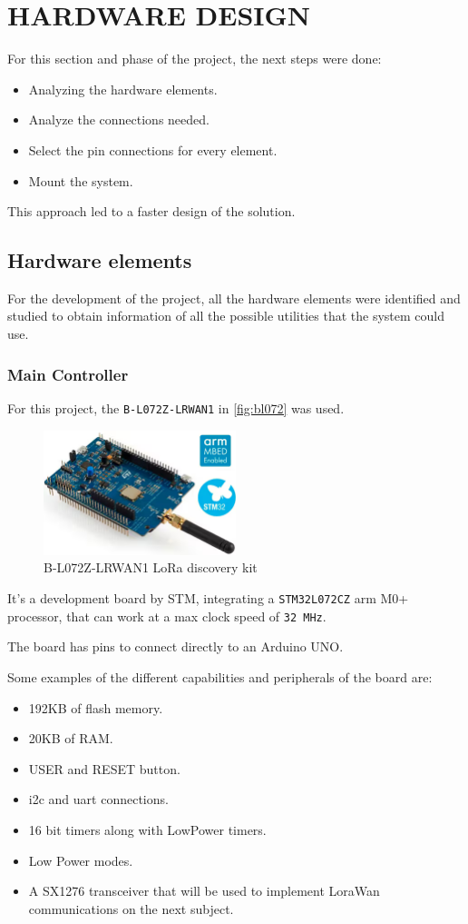\section{HARDWARE DESIGN}
For this section and phase of the project, the next steps were done:
\begin{itemize}
    \item Analyzing the hardware elements.
    \item Analyze the connections needed.
    \item Select the pin connections for every element.
    \item Mount the system.
\end{itemize}
This approach led to a faster design of the solution.
\subsection{Hardware elements}
For the development of the project, all the hardware elements were identified and studied to obtain information of all the possible utilities that the system could use.
\subsubsection{Main Controller}
For this project, the \texttt{B-L072Z-LRWAN1}\cite{DISCOL072CZLRWAN1Mbeda} in \autoref{fig:bl072} was used.
\begin{figure}[H]
    \centering
    \includegraphics[width=0.5\textwidth]{images/3/loraboard.png}
    \caption{B-L072Z-LRWAN1 LoRa discovery kit}
    \label{fig:bl072}
\end{figure}

It's a development board by STM, integrating a \texttt{STM32L072CZ}\cite{STM32L072CZUltralowpowerArm} arm M0+ processor, that can work at a max clock speed of \texttt{32 MHz}.

The board has pins to connect directly to an Arduino UNO.

Some examples of the different capabilities and peripherals of the board are:
\begin{itemize}
    \item 192KB of flash memory.
    \item 20KB of RAM.
    \item USER and RESET button.
    \item \acrshort{i2c} and \acrshort{uart} connections.
    \item 16 bit timers along with LowPower timers.
    \item Low Power modes.
    \item A SX1276 transceiver that will be used to implement LoraWan communications on the next subject.
\end{itemize}


